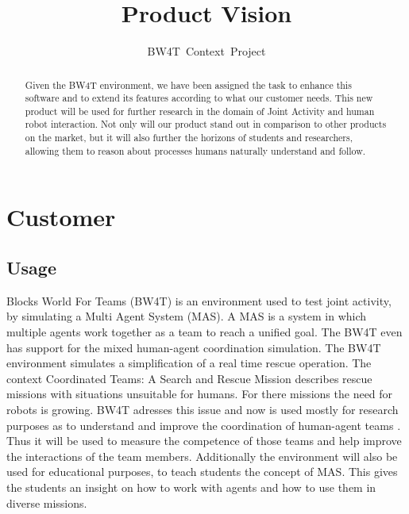 \documentclass[oneside]{tudelft-report}
\begin{document}
\frontmatter

\title[Blocks World for Teams]{Product Vision}
\author{BW4T~Context~Project}
\makecover

\mainmatter	


\pagebreak
\begin{abstract}
Given the BW4T environment, we have been assigned the task to enhance this software and to extend its features according to what our customer needs. This new product will be used for further research in the domain of Joint Activity and human robot interaction. Not only will our product stand out in comparison to other products on the market, but it will also further the horizons of students and researchers, allowing them to reason about processes humans naturally understand and follow.
\end{abstract}

\pagebreak
\tableofcontents
\pagebreak

\section{Customer}
\subsection{Usage}
Blocks World For Teams (BW4T) \cite{bw4t} is an environment used to test joint activity, by simulating a Multi Agent System (MAS). A MAS is a system in which multiple agents work together as a team to reach a unified goal. The BW4T even has support for the mixed human-agent coordination simulation. The BW4T environment simulates a simplification of a real time rescue operation. The context Coordinated Teams: A Search and Rescue Mission \cite{context} describes rescue missions with situations unsuitable for humans. For there missions the need for robots is growing. BW4T adresses this issue and now is used mostly for research purposes as to understand and improve the coordination of human-agent teams \cite{humanagent}. Thus it will be used to measure the competence of those teams and help improve the interactions of the team members. Additionally the environment will also be used for educational purposes, to teach students the concept of MAS. This gives the students an insight on how to work with agents and how to use them in diverse missions.
\end{document}
